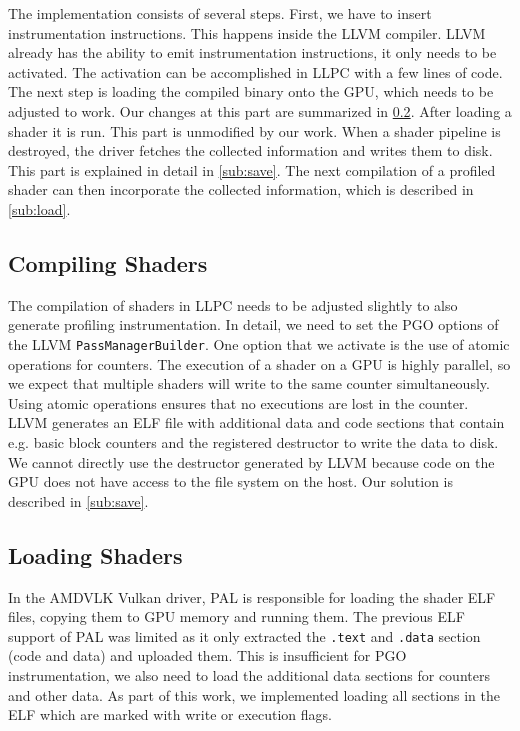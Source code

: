 \clearpage
{}
The implementation consists of several steps. First, we have to insert instrumentation instructions. This happens inside the LLVM compiler. LLVM already has the ability to emit instrumentation instructions, it only needs to be activated. The activation can be accomplished in LLPC with a few lines of code. The next step is loading the compiled binary onto the GPU, which needs to be adjusted to work. Our changes at this part are summarized in \cref{sub:loading}. After loading a shader it is run. This part is unmodified by our work. When a shader pipeline is destroyed, the driver fetches the collected information and writes them to disk. This part is explained in detail in \cref{sub:save}. The next compilation of a profiled shader can then incorporate the collected information, which is described in \cref{sub:load}.

\subsection{Compiling Shaders}
\label{sub:compiling}
The compilation of shaders in LLPC needs to be adjusted slightly to also generate profiling instrumentation. In detail, we need to set the PGO options of the LLVM \texttt{PassManagerBuilder}. One option that we activate is the use of atomic operations for counters. The execution of a shader on a GPU is highly parallel, so we expect that multiple shaders will write to the same counter simultaneously. Using atomic operations ensures that no executions are lost in the counter. LLVM generates an ELF file with additional data and code sections that contain e.g. basic block counters and the registered destructor to write the data to disk. We cannot directly use the destructor generated by LLVM because code on the GPU does not have access to the file system on the host. Our solution is described in \cref{sub:save}.

\subsection{Loading Shaders}
\label{sub:loading}
In the AMDVLK Vulkan driver, PAL is responsible for loading the shader ELF files, copying them to GPU memory and running them. The previous ELF support of PAL was limited as it only extracted the \texttt{.text} and \texttt{.data} section (code and data) and uploaded them. This is insufficient for PGO instrumentation, we also need to load the additional data sections for counters and other data. As part of this work, we implemented loading all sections in the ELF which are marked with write or execution flags.

